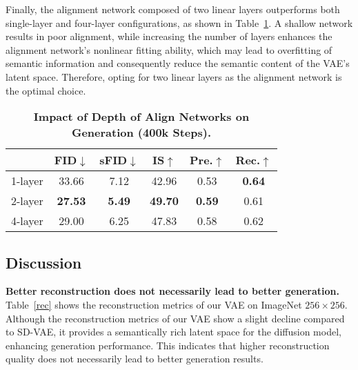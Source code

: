 Finally, the alignment network composed of two linear layers outperforms both single-layer and four-layer configurations, as shown in Table~\ref{Ablation 3}. A shallow network results in poor alignment, while increasing the number of layers enhances the alignment network's nonlinear fitting ability, which may lead to overfitting of semantic information and consequently reduce the semantic content of the VAE's latent space. Therefore, opting for two linear layers as the alignment network is the optimal choice.

\begin{table}[ht]
\centering
\small %
\vskip -0.1in
\caption{\textbf{Impact of Depth of Align Networks on Generation (400k Steps).}}
\begin{tabular}{l|ccccc}
\toprule
        & FID$\downarrow$ & sFID$\downarrow$ & IS$\uparrow$ & Pre.$\uparrow$ & Rec.$\uparrow$ \\ \midrule
1-layer & 33.66           & 7.12             & 42.96        & 0.53                & \textbf{0.64}    \\
2-layer & \textbf{27.53}  & \textbf{5.49}    & \textbf{49.70} & \textbf{0.59}     & 0.61             \\
4-layer & 29.00           & 6.25             & 47.83        & 0.58                & 0.62             \\ \bottomrule
\end{tabular}
\label{Ablation 3}
\vskip -0.1in
\end{table}

\subsection{Discussion}
\label{discussion}
\textbf{Better reconstruction does not necessarily lead to better generation.} Table~\ref{rec} shows the reconstruction metrics of our VAE on ImageNet $256\times256$. Although the reconstruction metrics of our VAE show a slight decline compared to SD-VAE, it provides a semantically rich latent space for the diffusion model, enhancing generation performance. This indicates that higher reconstruction quality does not necessarily lead to better generation results.

